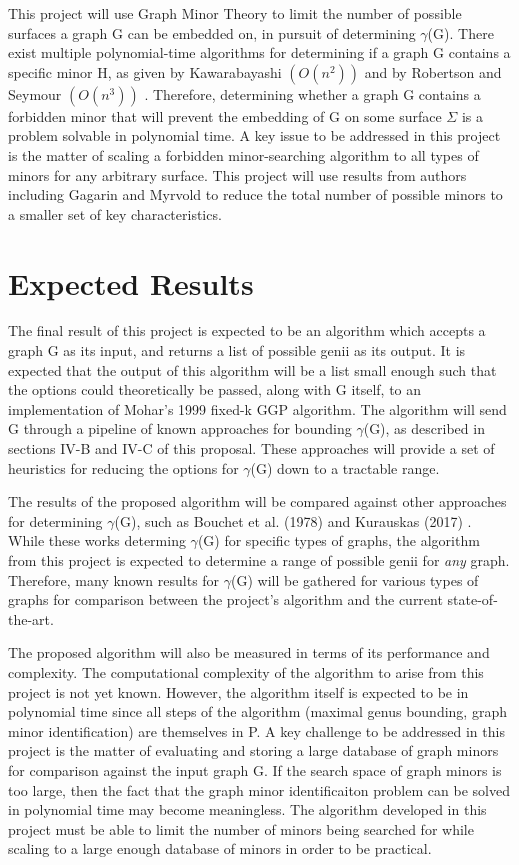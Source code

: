 \documentclass[12pt,conference]{IEEEtran}
\begin{document}
This project will use Graph Minor Theory to limit the number of possible surfaces a graph G can be embedded on, in pursuit of determining $\gamma$(G). There exist multiple polynomial-time algorithms for determining if a graph G contains a specific minor H, as given by Kawarabayashi $(O(n^2))$ \cite{kawarabayashi} and by Robertson and Seymour $(O(n^3))$ \cite{graph-minors-13}. Therefore, determining whether a graph G contains a forbidden minor that will prevent the embedding of G on some surface $\Sigma$ is a problem solvable in polynomial time. A key issue to be addressed in this project is the matter of scaling a forbidden minor-searching algorithm to all types of minors for any arbitrary surface. This project will use results from authors including Gagarin and Myrvold \cite{gagarin-myrvold} to reduce the total number of possible minors to a smaller set of key characteristics.

\section{Expected Results}

The final result of this project is expected to be an algorithm which accepts a graph G as its input, and returns a list of possible genii as its output. It is expected that the output of this algorithm will be a list small enough such that the options could theoretically be passed, along with G itself, to an implementation of Mohar's 1999 fixed-k GGP algorithm. The algorithm will send G through a pipeline of known approaches for bounding $\gamma$(G), as described in sections IV-B and IV-C of this proposal. These approaches will provide a set of heuristics for reducing the options for $\gamma$(G) down to a tractable range. 

The results of the proposed algorithm will be compared against other approaches for determining $\gamma$(G), such as Bouchet et al. (1978) \cite{bouchet} and Kurauskas (2017) \cite{kurauskas}. While these works determing $\gamma$(G) for specific types of graphs, the algorithm from this project is expected to determine a range of possible genii for \textit{any} graph. Therefore, many known results for $\gamma$(G) will be gathered for various types of graphs for comparison between the project's algorithm and the current state-of-the-art.

The proposed algorithm will also be measured in terms of its performance and complexity. The computational complexity of the algorithm to arise from this project is not yet known. However, the algorithm itself is expected to be in polynomial time since all steps of the algorithm (maximal genus bounding, graph minor identification) are themselves in P. A key challenge to be addressed in this project is the matter of evaluating and storing a large database of graph minors for comparison against the input graph G. If the search space of graph minors is too large, then the fact that the graph minor identificaiton problem can be solved in polynomial time may become meaningless. The algorithm developed in this project must be able to limit the number of minors being searched for while scaling to a large enough database of minors in order to be practical. 
\end{document}
